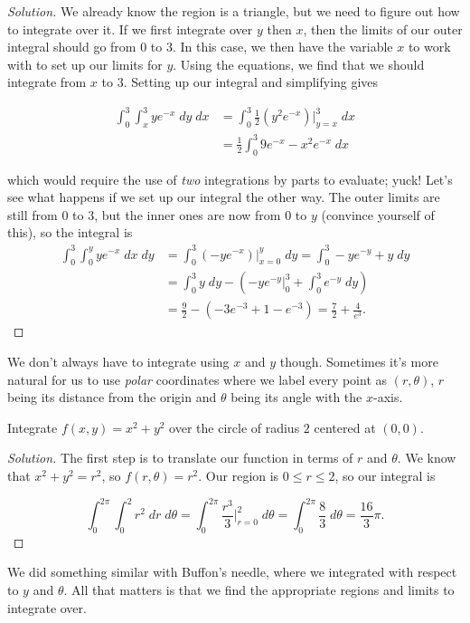 \documentclass[11 pt]{scrartcl}
\begin{document}
\begin{proof}[Solution]
    We already know the region is a triangle, but we need to figure out how to integrate over it. If we first integrate over $y$ then $x$, then the limits of our outer integral should go from $0$ to 3. In this case, we then have the variable $x$ to work with to set up our limits for $y$. Using the equations, we find that we should integrate from $x$ to $3$. Setting up our integral and simplifying gives 

    \begin{align*}
    \int_0^3 \int_x^3 ye^{-x} \; dy \; dx &= \int_0^3 \frac 12 (y^2 e^{-x})\Big\rvert^3_{y = x} \; dx \\ 
                                          &= \frac 12 \int_0^3 9e^{-x} - x^2e^{-x}\; dx
    \end{align*}
    
    which would require the use of \emph{two} integrations by parts to evaluate; yuck! Let's see what happens if we set up our integral the other way. The outer limits are still from 0 to 3, but the inner ones are now from 0 to $y$ (convince yourself of this), so the integral is 
    \begin{align*}
    \int_0^3 \int_0^y ye^{-x} \; dx \; dy &= \int_0^3  (-y e^{-x})\Big\rvert^y_{x = 0} \; dy  = \int_0^3 -y e^{-y} + y \; dy \\ 
                                          &= \int_0^3 y \; dy - \left(-ye^{-y}\Big\rvert^3_0 + \int_0^3 e^{-y}\; dy \right) \\ 
                                          &= \frac{9}{2} - (-3e^{-3} + 1 - e^{-3}) = \boxed{\frac{7}{2} + \frac{4}{e^3}}.
    \end{align*}
\end{proof}

We don't always have to integrate using $x$ and $y$ though. Sometimes it's more natural for us to use \emph{polar} coordinates where we label every point as $(r, \theta)$, $r$ being its distance from the origin and $\theta$ being its angle with the $x$-axis. 

\begin{example}
    Integrate $f(x,y) = x^2 + y^2$ over the circle of radius $2$ centered at $(0,0)$. 
\end{example}
\begin{proof}[Solution]
    The first step is to translate our function in terms of $r$ and $\theta$. We know that $x^2 + y^2 = r^2$, so $f(r, \theta) = r^2$. Our region is $0\leq r \leq 2$, so our integral is 

\[ \int_{0}^{2\pi} \int_{0}^2 r^2 \; dr\; d\theta = \int_0^{2\pi} \frac{r^3}{3} \Big\rvert^2_{r=0} \; d\theta = \int_0^{2\pi} \frac{8}{3} \; d\theta = \dfrac{16}{3}\pi.\] 
\end{proof}
We did something similar with Buffon's needle, where we integrated with respect to $y$ and $\theta$. All that matters is that we find the appropriate regions and limits to integrate over. 
\end{document}
